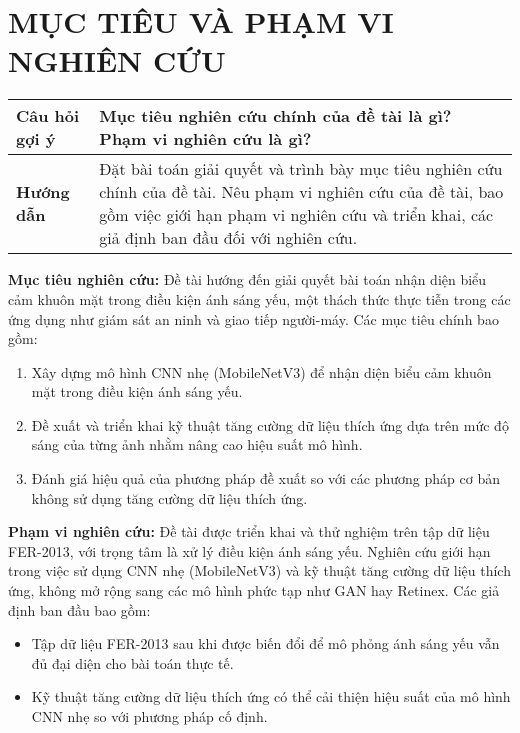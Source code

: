 \section*{MỤC TIÊU VÀ PHẠM VI NGHIÊN CỨU}

\begin{tabular}{|p{4cm}|p{11cm}|}
    \hline
    \textbf{Câu hỏi gợi ý} & Mục tiêu nghiên cứu chính của đề tài là gì? Phạm vi nghiên cứu là gì? \\
    \hline
    \textbf{Hướng dẫn} & Đặt bài toán giải quyết và trình bày mục tiêu nghiên cứu chính của đề tài. Nêu phạm vi nghiên cứu của đề tài, bao gồm việc giới hạn phạm vi nghiên cứu và triển khai, các giả định ban đầu đối với nghiên cứu. \\
    \hline
\end{tabular}

\medskip

\textbf{Mục tiêu nghiên cứu:} Đề tài hướng đến giải quyết bài toán nhận diện biểu cảm khuôn mặt trong điều kiện ánh sáng yếu, một thách thức thực tiễn trong các ứng dụng như giám sát an ninh và giao tiếp người-máy. Các mục tiêu chính bao gồm:  
\begin{enumerate}
    \item Xây dựng mô hình CNN nhẹ (MobileNetV3) để nhận diện biểu cảm khuôn mặt trong điều kiện ánh sáng yếu.
    \item Đề xuất và triển khai kỹ thuật tăng cường dữ liệu thích ứng dựa trên mức độ sáng của từng ảnh nhằm nâng cao hiệu suất mô hình.
    \item Đánh giá hiệu quả của phương pháp đề xuất so với các phương pháp cơ bản không sử dụng tăng cường dữ liệu thích ứng.
\end{enumerate}

\textbf{Phạm vi nghiên cứu:} Đề tài được triển khai và thử nghiệm trên tập dữ liệu FER-2013, với trọng tâm là xử lý điều kiện ánh sáng yếu. Nghiên cứu giới hạn trong việc sử dụng CNN nhẹ (MobileNetV3) và kỹ thuật tăng cường dữ liệu thích ứng, không mở rộng sang các mô hình phức tạp như GAN hay Retinex. Các giả định ban đầu bao gồm:  
\begin{itemize}
    \item Tập dữ liệu FER-2013 sau khi được biến đổi để mô phỏng ánh sáng yếu vẫn đủ đại diện cho bài toán thực tế.
    \item Kỹ thuật tăng cường dữ liệu thích ứng có thể cải thiện hiệu suất của mô hình CNN nhẹ so với phương pháp cố định.
\end{itemize}
